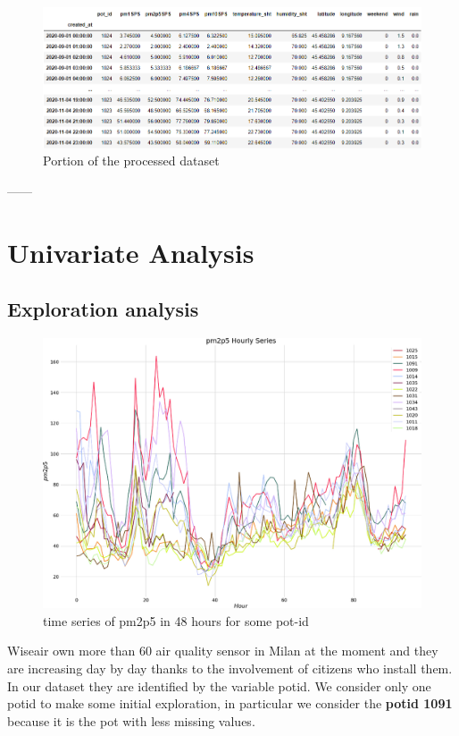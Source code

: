 \documentclass{article}
\begin{document}
\begin{figure}[h!]
  \centering
  \includegraphics[width=5in]{dataset.png}
  \caption{Portion of the processed dataset}
\end{figure}


------
\newpage
\section{\textbf{Univariate Analysis}}
\subsection{Exploration analysis}
\begin{figure}[h!]
    \centering
    \includegraphics[scale=0.3]{plotDati.png}
    \caption{time series of pm2p5 in 48 hours for some pot-id}
\end{figure}
Wiseair own more than 60 air quality sensor in Milan at the moment and they are increasing day by day thanks to the involvement of citizens who install them.\\ 

In our dataset they are identified by the variable potid. 
We consider only one potid to make some initial exploration, in particular we consider the \textbf{potid 1091} because it is the pot with less missing values.
\end{document}
